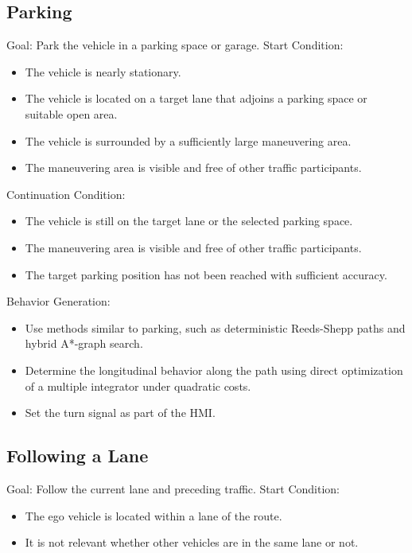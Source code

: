 \subsection{Parking}

Goal: Park the vehicle in a parking space or garage.
Start Condition:

\begin{itemize}
    \item The vehicle is nearly stationary.
    \item The vehicle is located on a target lane that adjoins a parking space or suitable open area.
    \item The vehicle is surrounded by a sufficiently large maneuvering area.
    \item The maneuvering area is visible and free of other traffic participants.
\end{itemize}

Continuation Condition:

\begin{itemize}
    \item The vehicle is still on the target lane or the selected parking space.
    \item The maneuvering area is visible and free of other traffic participants.
    \item The target parking position has not been reached with sufficient accuracy.
\end{itemize}

Behavior Generation:

\begin{itemize}
    \item Use methods similar to parking, such as deterministic Reeds-Shepp paths and hybrid A*-graph search.
    \item Determine the longitudinal behavior along the path using direct optimization of a multiple integrator under quadratic costs.
    \item Set the turn signal as part of the HMI.
\end{itemize}


\subsection{Following a Lane}

Goal: Follow the current lane and preceding traffic.
Start Condition:

\begin{itemize}
    \item The ego vehicle is located within a lane of the route.
    \item It is not relevant whether other vehicles are in the same lane or not.
\end{itemize}

